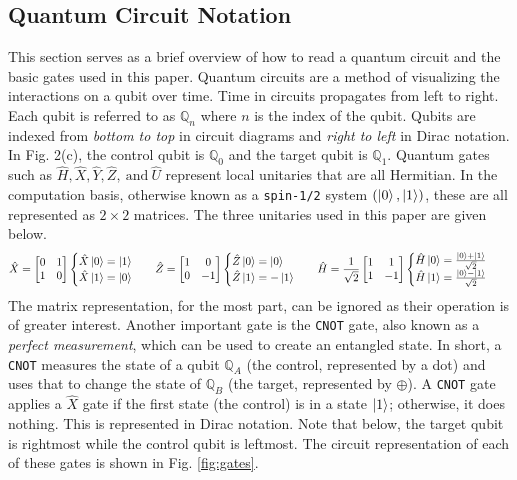 \documentclass[%
 aip,
cp,  %
 amsmath,amssymb,%
 reprint,%
]{revtex4-2}
\newcommand{\Q}{\mathbb{Q}}
\begin{document}
    \subsection{Quantum Circuit Notation}
        This section serves as a brief overview of how to read a quantum circuit and the basic gates used in this paper. Quantum circuits are a method of visualizing the interactions on a qubit over time.  Time in circuits propagates from left to right. Each qubit is referred to as $\Q_n$ where $n$ is the index of the qubit. Qubits are indexed from \textit{bottom to top} in circuit diagrams and \textit{right to left} in Dirac notation. In Fig. 2(c), the control qubit is $\Q_0$ and the target qubit is $\Q_1$. Quantum gates such as $\hat{H}, \hat{X}, \hat{Y}, \hat{Z}, \ \text{and} \ \hat{U}$ represent local unitaries that are all Hermitian. In the computation basis, otherwise known as a \texttt{spin-1/2} system $\left(\ket{0}, \ket{1}\right)$, these are all represented as $2\times 2$ matrices. The three unitaries used in this paper are given below. 
            \begin{align*}
                \hat{X} &= \begin{bmatrix}0 & 1 \\1 & 0\end{bmatrix} \begin{cases}\hat{X}\ket{0} = \ket{1} \\ \hat{X}\ket{1} = \ket{0}\end{cases} &
                \hat{Z} &= \begin{bmatrix}1 & 0 \\0 & -1\end{bmatrix}\begin{cases}\hat{Z}\ket{0} = \ket{0} \\ \hat{Z}\ket{1} = -\ket{1}\end{cases} &
                \hat{H} &= \frac{1}{\sqrt{2}}\begin{bmatrix}1 & 1 \\1 & -1\end{bmatrix}\begin{cases}\hat{H}\ket{0} =\frac{\ket{0}+\ket{1}}{\sqrt{2}} \\ \hat{H}\ket{1} = \frac{\ket{0}-\ket{1}}{\sqrt{2}}\end{cases}
            \end{align*}
            The matrix representation, for the most part, can be ignored as their operation is of greater interest. Another important gate is the \texttt{CNOT} gate, also known as a \textit{perfect measurement}, which can be used to create an entangled state. In short, a \texttt{CNOT} measures the state of a qubit $\Q_A$ (the control, represented by a dot) and uses that to change the state of $\Q_B$ (the target, represented by $\oplus$). A \texttt{CNOT} gate applies a $\hat{X}$ gate if the first state (the control) is in a state $\ket{1}$; otherwise, it does nothing. This is represented in Dirac notation. Note that below, the target qubit is rightmost while the control qubit is leftmost. The circuit representation of each of these gates is shown in Fig.  \ref{fig:gates}.
\end{document}
